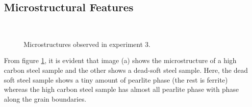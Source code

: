 \documentclass[12pt,a4paper]{article}
\begin{document}
%
%
%
%
%
%
%
%
%
\subsection{Microstructural Features}
\begin{figure}[H]%
    \centering
    \quad
    \\
    \caption{Microstructures observed in experiment 3.}%
    \label{mic}%
\end{figure}
From figure \ref{mic}, it is evident that image (a) shows the microstructure of a high carbon steel sample and the other shows a dead-soft steel sample. Here, the dead soft steel sample shows a tiny amount of pearlite phase (the rest is ferrite) whereas the high carbon steel sample has almost all pearlite phase with  phase along the grain boundaries.
\end{document}

